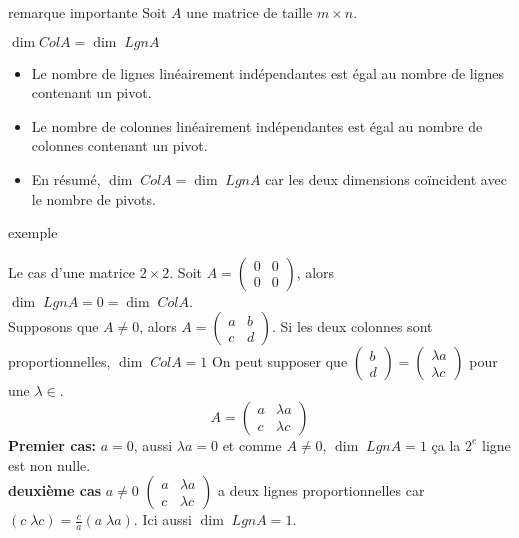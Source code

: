 
\begin{parag}
    

\begin{subparag}{remarque importante}
Soit $A$ une matrice de taille $m \times n$.
\begin{theoreme}

    $\dim ColA = \dim\; LgnA$

\end{theoreme}
\begin{itemize}
    \item Le nombre de lignes linéairement indépendantes est égal au nombre de lignes contenant un pivot.
    \item Le nombre de colonnes linéairement indépendantes est égal au nombre de colonnes contenant un pivot.
    \item En résumé, $\dim\; ColA = \dim\; LgnA$ car les deux dimensions coïncident avec le nombre de pivots.

\end{itemize}
    
\end{subparag}


\begin{subparag}{exemple}

Le cas d'une matrice $2\times 2$.
Soit $A =  \begin{pmatrix}
    0 & 0 \\ 0 & 0
\end{pmatrix}$, alors $\dim\; LgnA = 0 = \dim \; ColA$.\\
Supposons que $A \neq 0$, alors $A = \begin{pmatrix}
    a & b \\ c & d
\end{pmatrix}$. Si les deux colonnes sont proportionnelles, $\dim\; ColA = 1$  On peut supposer que $\begin{pmatrix}
    b \\ d
\end{pmatrix} = \begin{pmatrix}
    \lambda a \\ \lambda c
\end{pmatrix}$ pour une $\lambda \in $\R. 
\[A = \begin{pmatrix}
    a & \lambda a \\ c & \lambda c
\end{pmatrix}\]
\textbf{Premier cas:} $a = 0$, aussi $\lambda a = 0$ et comme $A \neq 0$, $\dim \; LgnA = 1$ ça la $2^e$ ligne est non nulle.
\\
\textbf{deuxième cas} $a \neq 0$ $\begin{pmatrix}
    a & \lambda a \\ c & \lambda c
\end{pmatrix}  $ a deux lignes proportionnelles car $\left(c \; \lambda c\right) = \frac{c}{a}\left(a \; \lambda a\right)$. Ici aussi $\dim \; LgnA = 1$.
    
\end{subparag}

\end{parag}

